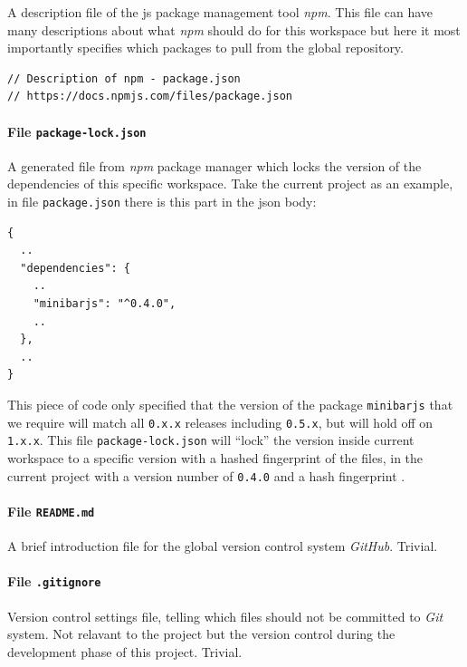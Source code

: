 A description file of the \gls{js} package management tool \emph{npm}. This file can have many descriptions about what \emph{npm} should do for this workspace but here it most importantly specifies which packages to pull from the global repository. 

\begin{verbatim}
// Description of npm - package.json
// https://docs.npmjs.com/files/package.json
\end{verbatim}

\paragraph{File \texttt{package-lock.json}}

A generated file from \emph{npm} package manager which locks the version of the dependencies of this specific workspace. Take the current project as an example, in file \texttt{package.json} there is this part in the \gls{json} body:

\begin{verbatim}
{
  ..
  "dependencies": {
    ..
    "minibarjs": "^0.4.0",
    ..
  },
  ..
}
\end{verbatim}

This piece of code only specified that the version of the package \texttt{minibarjs} that we require will match all \texttt{0.x.x} releases including \texttt{0.5.x}, but will hold off on \texttt{1.x.x}. This file \texttt{package-lock.json} will ``lock'' the version inside current workspace to a specific version with a hashed fingerprint of the files, in the current project with a version number of \texttt{0.4.0} and a hash fingerprint .

\paragraph{File \texttt{README.md}}

A brief introduction file for the global version control system \emph{GitHub}. Trivial.

\paragraph{File \texttt{.gitignore}}

Version control settings file, telling which files should not be committed to \emph{Git} system. Not relavant to the project but the version control during the development phase of this project. Trivial.


